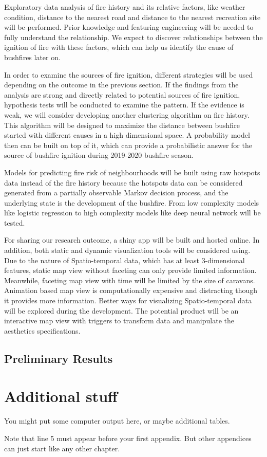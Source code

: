 \documentclass{monashthesis}
\begin{document}
Exploratory data analysis of fire history and its relative factors, like weather condition, distance to the nearest road and distance to the nearest recreation site will be performed.
Prior knowledge and featuring engineering will be needed to fully understand the relationship. We expect to discover relationships between the ignition of fire with these factors, which can help us identify the cause of bushfires later on.

In order to examine the sources of fire ignition, different strategies will be used depending on the outcome in the previous section. If the findings from the analysis are strong and directly related to potential sources of fire ignition, hypothesis tests will be conducted to examine the pattern. If the evidence is weak, we will consider developing another clustering algorithm on fire history. This algorithm will be designed to maximize the distance between bushfire started with different causes in a high dimensional space. A probability model then can be built on top of it, which can provide a probabilistic answer for the source of bushfire ignition during 2019-2020 bushfire season.

Models for predicting fire risk of neighbourhoods will be built using raw hotspots data instead of the fire history because the hotspots data can be considered generated from a partially observable Markov decision process, and the underlying state is the development of the bushfire. From low complexity models like logistic regression to high complexity models like deep neural network will be tested.

For sharing our research outcome, a shiny app will be built and hosted online. In addition, both static and dynamic visualization tools will be considered using. Due to the nature of Spatio-temporal data, which has at least 3-dimensional features, static map view without faceting can only provide limited information. Meanwhile, faceting map view with time will be limited by the size of caravans. Animation based map view is computationally expensive and distracting though it provides more information. Better ways for visualizing Spatio-temporal data will be explored during the development. The potential product will be an interactive map view with triggers to transform data and manipulate the aesthetics specifications.

\hypertarget{preliminary-results}{%
\section{Preliminary Results}\label{preliminary-results}}

\appendix

\hypertarget{additional-stuff}{%
\chapter{Additional stuff}\label{additional-stuff}}

You might put some computer output here, or maybe additional tables.

Note that line 5 must appear before your first appendix. But other appendices can just start like any other chapter.

\printbibliography[heading=bibintoc]
\end{document}
